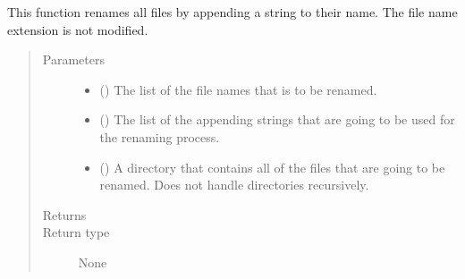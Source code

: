 \documentclass[letterpaper,10pt,english]{sphinxmanual}
\begin{document}

\begin{fulllineitems}
\label{\detokenize{docstrings/ifa_smeargle.core.io:ifa_smeargle.core.io.rename_by_parallel_append}}
This function renames all files by appending a string to
their name. The file name extension is not modified.
\begin{quote}\begin{description}
\item[{Parameters}] \leavevmode\begin{itemize}
\item {} 
 () \textendash{} The list of the file names that is to be renamed.

\item {} 
 () \textendash{} The list of the appending strings that are going to be used
for the renaming process.

\item {} 
 (\sphinxstyleliteralemphasis{\sphinxupquote{ (}}\sphinxstyleliteralemphasis{\sphinxupquote{)}}) \textendash{} A directory that contains all of the files that are going to
be renamed. Does not handle directories recursively.

\end{itemize}

\item[{Returns}] \leavevmode


\item[{Return type}] \leavevmode
None

\end{description}\end{quote}

\end{fulllineitems}

\end{document}
